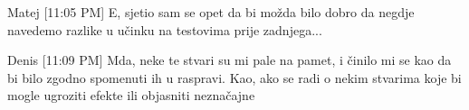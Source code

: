 \documentclass[../main.tex]{subfiles}
\begin{document}
Matej [11:05 PM]
E, sjetio sam se opet da bi možda bilo dobro da negdje navedemo razlike u 
učinku na testovima prije zadnjega...

Denis [11:09 PM]
Mda, neke te stvari su mi pale na pamet, i činilo mi se kao da bi bilo zgodno 
spomenuti ih u raspravi. Kao, ako se radi o nekim stvarima koje bi mogle 
ugroziti efekte ili objasniti neznačajne

	
\end{document}

